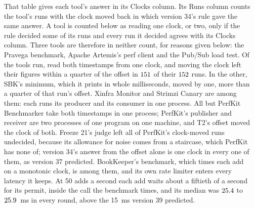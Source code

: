 \documentclass[10pt,journal,onecolumn]{IEEEtran}
\begin{document}
That table gives each tool's answer in its Clocks column. Its Runs column counts
the tool's runs with the clock moved back in which version 34's rule gave the same answer. A tool
is counted below as reading one clock, or two, only if the rule decided some of its runs and every
run it decided agrees with its Clocks column. Three tools are therefore in neither count, for
reasons given below: the Pravega benchmark, Apache Artemis's perf client and the Pub/Sub load test.
Of the tools run, \toolsOneClockWord{} read both timestamps from one clock, and moving the clock
left their figures within a quarter of the offset in $151$ of their
$152$ runs. In the
other, SBK's minimum, which it prints in whole milliseconds, moved by one, more than a quarter of
that run's offset. Xinfra Monitor and
Strimzi Canary are among them: each runs its producer and its consumer in one process. All but
PerfKit Benchmarker take both timestamps in one process; PerfKit's publisher and receiver are two
processes of one program on one machine, and T2's offset moved the clock of both. Freeze 21's judge
left all of PerfKit's clock-moved runs undecided, because its allowance for noise comes from a
staircase, which PerfKit has none of; version 34's answer from the offset alone is one clock in
every one of them, as version 37 predicted. BookKeeper's benchmark, which times each add on a
monotonic clock, is among them, and its own rate limiter enters every latency it keeps. At 50 adds
a second each add waits about a fiftieth of a second for its permit, inside the call the benchmark
times, and its median was $25.4$ to $25.9$~ms in every
round, above the 15~ms version 39 predicted.
\end{document}
